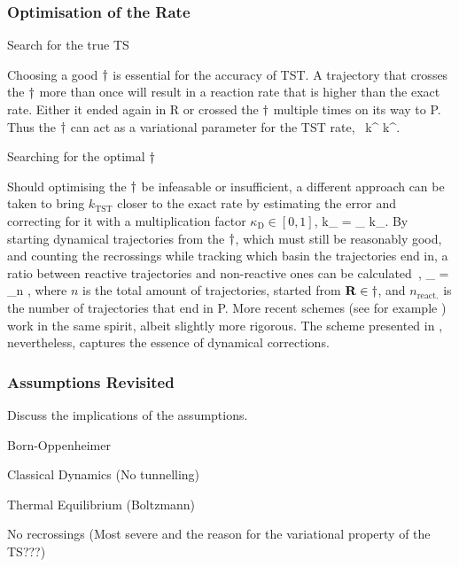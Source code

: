 \subsubsection{Optimisation of the Rate}
\bit
\item Search for the true TS
\eit

Choosing a good $\dagger$ is essential for the accuracy of TST.
A trajectory that crosses the $\dagger$ more than once will result in a reaction rate that is higher than the exact rate.
Either it ended again in R or crossed the $\dagger$ multiple times on its way to P.
Thus the $\dagger$ can act as a variational parameter for the TST rate,~\cite{vtst-1938, vtst-review-1984, vtst-2005}
k^ \ge k^.
\eeq

Searching for the optimal $\dagger$ \expand

Should optimising the $\dagger$ be infeasable or insufficient, a different approach can be taken to bring $k_\text{TST}$ closer to the exact rate by estimating the error and correcting for it with a multiplication factor $\kappa_\text{D} \in [0, 1]$,
k_ = \kappa_ \text{ } k_.
\eeq
By starting dynamical trajectories from the $\dagger$, which must still be reasonably good, and counting the recrossings while tracking which basin the trajectories end in, a ratio between reactive trajectories and non-reactive ones can be calculated~\cite{dynamical-corrections-keck-1962},
\kappa_ = \lim_{n \rightarrow \infty} ,
\eeq
where $n$ is the total amount of trajectories, started from ${\mathrm{\mathbf{\bm{R}}}} \in \dagger$, and $n_\text{react.}$ is the number of trajectories that end in P.
More recent schemes (see for example \cite{vtst-2005, dynamical-corrections-chandler-1977, dynamical-corrections-bennett-1977}) work in the same spirit, albeit slightly more rigorous.
The scheme presented in , nevertheless, captures the essence of dynamical corrections.

\subsubsection{Assumptions Revisited}
Discuss the implications of the assumptions.
\bit
\item Born-Oppenheimer
\item Classical Dynamics (No tunnelling)
\item Thermal Equilibrium (Boltzmann)
\item No recrossings (Most severe and the reason for the variational property of the TS???)
\eit
\placeholder

